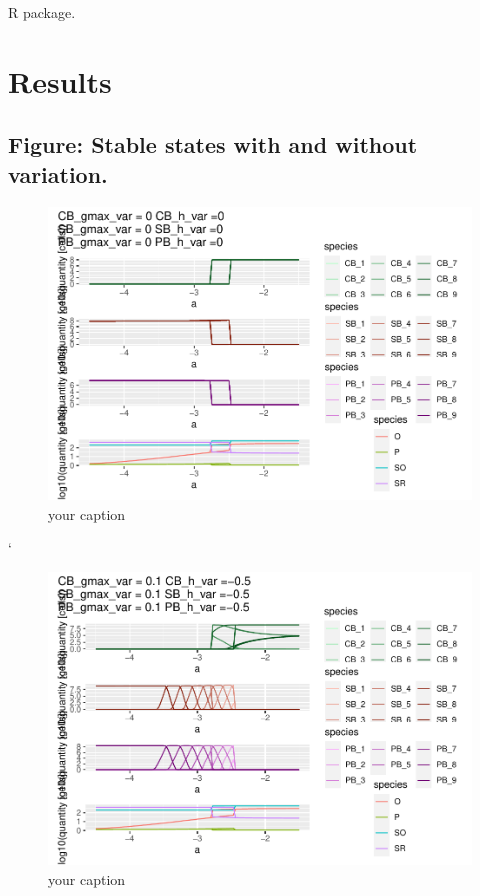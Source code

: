 \documentclass{article}
\begin{document}
R package.

\hypertarget{results}{%
\section{Results}\label{results}}

\hypertarget{figure-stable-states-with-and-without-variation.}{%
\subsection{Figure: Stable states with and without
variation.}\label{figure-stable-states-with-and-without-variation.}}

\begin{figure}

{\centering \includegraphics[width=1\linewidth]{article_files/figure-latex/ss_novar-1} 

}

\caption{your caption}\label{fig:ss_novar}
\end{figure}

`

\begin{figure}

{\centering \includegraphics[width=1\linewidth]{article_files/figure-latex/ss_var-1} 

}

\caption{your caption}\label{fig:ss_var}
\end{figure}
\end{document}
